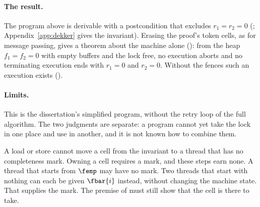\paragraph{The result.}
The program above is derivable with a postcondition that excludes
$r_1 = r_2 = 0$ (;
Appendix~\ref{app:dekker} gives the invariant). Erasing the proof's token
cells, as for message passing, gives a theorem about the machine alone
(): from the heap $f_1 = f_2 = 0$ with empty
buffers and the lock free, no execution aborts and no terminating execution ends with
$r_1 = 0$ and $r_2 = 0$. Without the fences such an execution exists
().

\paragraph{Limits.}
This is the dissertation's simplified program, without the retry loop of
the full algorithm. The two
judgments are separate: a program cannot yet take the lock in one place and
use  in another, and it is not known how to combine them.

A load or store cannot move a cell from the invariant to a thread that
has no completeness mark. Owning a cell requires a mark, and these steps
earn none. A thread that
starts from $\femp$ may have no mark. Two threads that
start with nothing can each be given $\fbar{i}$ instead, without changing
the machine state.
That supplies the mark. The premise of  must still show that
the cell is there to take.
